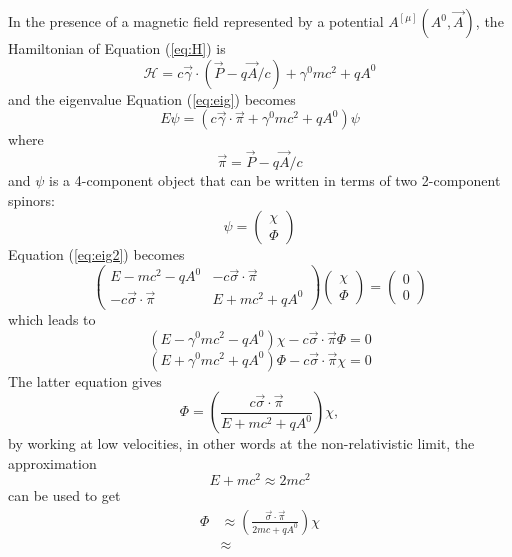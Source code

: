 \documentclass{outhesis}
\begin{document}
In the presence of a magnetic field represented by a potential $A^[\mu](A^0, \overrightarrow{A})$, the Hamiltonian of Equation (\ref{eq:H}) is
\begin{equation}
\label{eq:HB}
\mathcal{H} = c \overrightarrow{\gamma}\cdot \left(\overrightarrow{P}-q\overrightarrow{A}/c\right) + \gamma^0mc^2+qA^0
\end{equation}
and the eigenvalue Equation (\ref{eq:eig}) becomes
\begin{equation}
\label{eq:eig2}
E\psi = \left( c\overrightarrow{\gamma}\cdot \overrightarrow{\pi} + \gamma^0mc^2 + qA^0 \right)\psi
\end{equation}
where 
\[ \overrightarrow{\pi} =  \overrightarrow{P}-q \overrightarrow{A}/c \]
and $\psi$ is a 4-component object that can be written in terms of two 2-component spinors:
\[
\psi = 
\begin{pmatrix}
\chi \\
\Phi
\end{pmatrix}
\]
Equation (\ref{eq:eig2}) becomes
\begin{equation}
\label{eq:eig3}
\begin{pmatrix}
E-mc^2-qA^0 & -c\overrightarrow{\sigma}\cdot \overrightarrow{\pi}\\
-c\overrightarrow{\sigma}\cdot \overrightarrow{\pi} & E+mc^2+qA^0
\end{pmatrix}
\begin{pmatrix}
\chi \\
\Phi
\end{pmatrix}
=
\begin{pmatrix}
0 \\
0
\end{pmatrix}
\end{equation}
which leads to
\begin{equation}
\left( E-\gamma^0mc^2-qA^0 \right)\chi -c\overrightarrow{\sigma}\cdot \overrightarrow{\pi}\Phi = 0
\end{equation}
\begin{equation}
\left( E+\gamma^0mc^2+qA^0 \right)\Phi -c\overrightarrow{\sigma}\cdot \overrightarrow{\pi}\chi = 0
\end{equation}
The latter equation gives
\begin{equation}
\Phi = \left(\frac{c\overrightarrow{\sigma}\cdot \overrightarrow{\pi}}{ E+mc^2+qA^0 }\right) \chi,
\end{equation}
by working at low velocities, in other words at the non-relativistic limit, the approximation
\[E + mc^2 \approx 2mc^2\]
can be used to get 
\begin{equation}
\begin{split}
\Phi &\approx \left(\frac{\overrightarrow{\sigma}\cdot \overrightarrow{\pi}}{ 2mc+qA^0 }\right) \chi\\
& \approx 
\end{split}
\end{equation}
\end{document}

